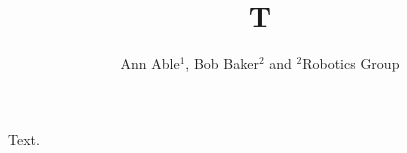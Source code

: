 \documentclass{article}
\begin{document}
\title{T}
\author{Ann Able$^1$, Bob Baker$^2$ and $^2$Robotics Group}
\maketitle
Text.
\end{document}
